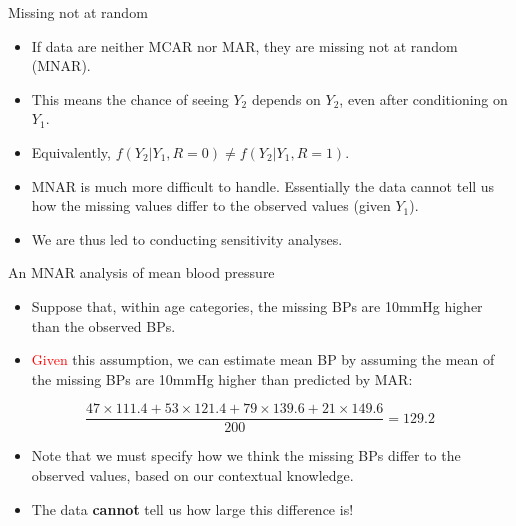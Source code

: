 \documentclass[ignorenonframetext,]{beamer}
\providecommand{\tightlist}{%
  \setlength{\itemsep}{0pt}\setlength{\parskip}{0pt}}
\begin{document}
\begin{frame}{Missing not at random}
\protect\hypertarget{missing-not-at-random}{}

\begin{itemize}
\tightlist
\item
  If data are neither MCAR nor MAR, they are missing not at random
  (MNAR).
\item
  This means the chance of seeing \(Y_{2}\) depends on \(Y_{2}\), even
  after conditioning on \(Y_{1}\).
\item
  Equivalently, \(f(Y_{2}|Y_{1},R=0) \neq f(Y_{2}|Y_{1},R=1)\).
\item
  MNAR is much more difficult to handle. Essentially the data cannot
  tell us how the missing values differ to the observed values (given
  \(Y_{1}\)).
\item
  We are thus led to conducting sensitivity analyses.
\end{itemize}

\end{frame}

\begin{frame}{An MNAR analysis of mean blood pressure}
\protect\hypertarget{an-mnar-analysis-of-mean-blood-pressure}{}

\begin{itemize}
\tightlist
\item
  Suppose that, within age categories, the missing BPs are 10mmHg higher
  than the observed BPs.
\item
  \textcolor{red}{Given} this assumption, we can estimate mean BP by
  assuming the mean of the missing BPs are 10mmHg higher than predicted
  by MAR:
\end{itemize}

\[ \frac{47 \times 111.4 + 53 \times 121.4 + 79 \times 139.6 + 21 \times 149.6}{200} = 129.2\]

\begin{itemize}
\tightlist
\item
  Note that we must specify how we think the missing BPs differ to the
  observed values, based on our contextual knowledge.
\item
  The data \textbf{cannot} tell us how large this difference is!
\end{itemize}

\end{frame}
\end{document}
